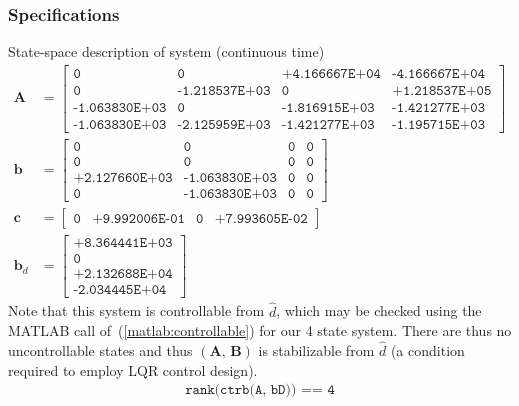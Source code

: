 \subsubsection{Specifications}
State-space description of system (continuous time)
\begin{align*}
\boldsymbol{A}
&=
\begin{bmatrix}
\texttt{0} & \texttt{0} & \texttt{+4.166667E+04} & \texttt{-4.166667E+04}\\
\texttt{0} & \texttt{-1.218537E+03} & \texttt{0} & \texttt{+1.218537E+05}\\
\texttt{-1.063830E+03} & \texttt{0} & \texttt{-1.816915E+03} & \texttt{-1.421277E+03}\\
\texttt{-1.063830E+03} & \texttt{-2.125959E+03} & \texttt{-1.421277E+03} & \texttt{-1.195715E+03}
\end{bmatrix}
\\[11pt]
\boldsymbol{b}
&=
\begin{bmatrix}
\texttt{0} & \texttt{0} & \texttt{0} & \texttt{0}\\
\texttt{0} & \texttt{0} & \texttt{0} & \texttt{0}\\
\texttt{+2.127660E+03} & \texttt{-1.063830E+03} & \texttt{0} & \texttt{0}\\
\texttt{0} & \texttt{-1.063830E+03} & \texttt{0} & \texttt{0}
\end{bmatrix}
\\[11pt]
\boldsymbol{c}
&=
\begin{bmatrix}
\texttt{0} & \texttt{+9.992006E-01} & \texttt{0} & \texttt{+7.993605E-02}
\end{bmatrix}
\\[11pt]
\boldsymbol{b}_d
&=
\begin{bmatrix}
\texttt{+8.364441E+03}\\
\texttt{0}\\
\texttt{+2.132688E+04}\\
\texttt{-2.034445E+04}
\end{bmatrix}
\end{align*}
Note that this system is controllable from $\hat{d}$, which may be checked using the \textsf{MATLAB} call of~(\ref{matlab:controllable}) for our 4 state system. There are thus no uncontrollable states and thus $(\boldsymbol{A}, \, \boldsymbol{B})$ is stabilizable from $\hat{d}$ (a condition required to employ LQR control design).
\begin{align}\label{matlab:controllable}
\texttt{rank(ctrb(A, bD)) == 4}
\end{align}
